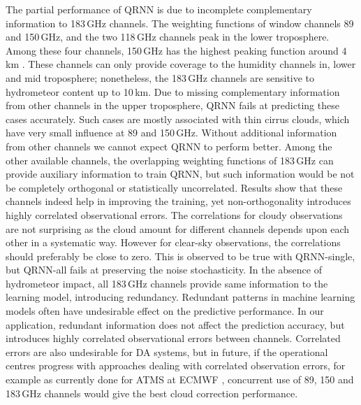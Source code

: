 \documentclass[amt, manuscript]{copernicus}
\begin{document}
The partial performance of QRNN is due to incomplete complementary information to 183\,GHz channels. The weighting functions of window channels 89 and 150\,GHz, and the two 118\,GHz channels peak in the lower troposphere. Among these four channels, 150\,GHz has the highest peaking function around 4\,km \citep{chen2020mwhs}. These channels can only provide coverage to the humidity channels in, lower and mid troposphere; nonetheless, the 183\,GHz channels are sensitive to hydrometeor content up to 10\,km. Due to missing complementary information from other channels in the upper troposphere, QRNN fails at predicting these cases accurately. Such cases are mostly associated with thin cirrus clouds, which have very small influence at 89 and 150\,GHz. Without additional information from other channels we cannot expect QRNN to perform better. Among the other available channels, the overlapping weighting functions of 183\,GHz can provide auxiliary information to train QRNN, but such information would be not be completely orthogonal or statistically uncorrelated. Results show that these channels indeed help in improving the training, yet non-orthogonality introduces highly correlated observational errors. The correlations for cloudy observations are not surprising as the cloud amount for different channels depends upon each other in a systematic way. However for clear-sky observations, the correlations should preferably be close to zero. This is observed to be true with QRNN-single, but QRNN-all fails at preserving the noise stochasticity. In the absence of hydrometeor impact, all 183\,GHz channels provide same information to the learning model, introducing redundancy. Redundant patterns in machine learning models often have undesirable effect on the predictive performance. In our application, redundant information does not affect the prediction accuracy, but introduces highly correlated observational errors between channels. Correlated errors are also undesirable for DA systems, but in future, if the operational centres progress with approaches dealing with correlated observation errors, for example as currently done for ATMS at ECMWF \citep{Weston2018eumATMS}, concurrent use of 89, 150 and 183\,GHz channels would give the best cloud correction performance.
\end{document}
